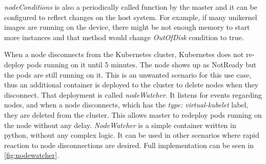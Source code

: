 \textit{nodeConditions} is also a periodically called function by the master and it can be configured to reflect changes on the host system. For example, if many unikernel images are running on the device, there might be not enough memory to start more instances and that method would change \textit{OutOfDisk} condition to true.

When a node disconnects from the Kubernetes cluster, Kubernetes does not re-deploy pods running on it until 5 minutes. The node shows up as NotReady but the pods are still running on it. This is an unwanted scenario for this use case, thus an additional container is deployed to the cluster to delete nodes when they disconnect. That deployment is called \textit{nodeWatcher}. It listens for events regarding nodes, and when a node disconnects, which has the \textit{type: virtual-kubelet} label, they are deleted from the cluster. This allows master to redeploy pods running on the node without any delay. \textit{NodeWatcher} is a simple container written in python, without any complex logic. It can be used in other scenarios where rapid reaction to node disconnections are desired. Full implementation can be seen in \ref{fig:nodewatcher}.